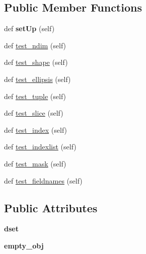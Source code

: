 \subsection*{Public Member Functions}
\begin{DoxyCompactItemize}
\item 
\mbox{\label{classh5py__LOCAL_1_1tests_1_1hl_1_1test__dataset__getitem_1_1TestEmpty_a0b13317ae32e78ed5dc3fd4a716ab249}} 
def {\bfseries set\+Up} (self)
\item 
def \hyperlink{classh5py__LOCAL_1_1tests_1_1hl_1_1test__dataset__getitem_1_1TestEmpty_a385f8c8d4735f7eabe49bd093b0d6bd5}{test\+\_\+ndim} (self)
\item 
def \hyperlink{classh5py__LOCAL_1_1tests_1_1hl_1_1test__dataset__getitem_1_1TestEmpty_a942efb324e9f9c8254abad34dda36c91}{test\+\_\+shape} (self)
\item 
def \hyperlink{classh5py__LOCAL_1_1tests_1_1hl_1_1test__dataset__getitem_1_1TestEmpty_a0489e1173ba29391f68c7c96c9852e2c}{test\+\_\+ellipsis} (self)
\item 
def \hyperlink{classh5py__LOCAL_1_1tests_1_1hl_1_1test__dataset__getitem_1_1TestEmpty_a9c53110040deeddaaad347a37e9403f4}{test\+\_\+tuple} (self)
\item 
def \hyperlink{classh5py__LOCAL_1_1tests_1_1hl_1_1test__dataset__getitem_1_1TestEmpty_ab213b61073ad09fd0721b9b2d42fb41b}{test\+\_\+slice} (self)
\item 
def \hyperlink{classh5py__LOCAL_1_1tests_1_1hl_1_1test__dataset__getitem_1_1TestEmpty_a9d5fa93221283550b0179378fdb28d86}{test\+\_\+index} (self)
\item 
def \hyperlink{classh5py__LOCAL_1_1tests_1_1hl_1_1test__dataset__getitem_1_1TestEmpty_a5e297fb77fd9b05d8ae1a284d71f8fbd}{test\+\_\+indexlist} (self)
\item 
def \hyperlink{classh5py__LOCAL_1_1tests_1_1hl_1_1test__dataset__getitem_1_1TestEmpty_af8e026a55fc096e732531b5a060f2d3e}{test\+\_\+mask} (self)
\item 
def \hyperlink{classh5py__LOCAL_1_1tests_1_1hl_1_1test__dataset__getitem_1_1TestEmpty_af123a802ff714bcda911b1c507612d89}{test\+\_\+fieldnames} (self)
\end{DoxyCompactItemize}
\subsection*{Public Attributes}
\begin{DoxyCompactItemize}
\item 
\mbox{\label{classh5py__LOCAL_1_1tests_1_1hl_1_1test__dataset__getitem_1_1TestEmpty_a687295256a8b89b642bec52c6f2f7738}} 
{\bfseries dset}
\item 
\mbox{\label{classh5py__LOCAL_1_1tests_1_1hl_1_1test__dataset__getitem_1_1TestEmpty_a14c63b5c0c0af3e3f9195391d899a9f8}} 
{\bfseries empty\+\_\+obj}
\end{DoxyCompactItemize}


